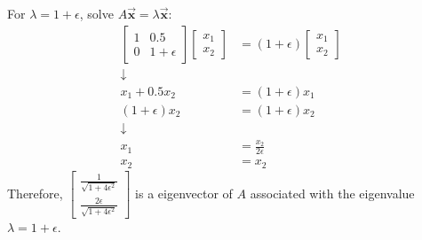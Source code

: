 \documentclass[letter, 11pt]{article}
\begin{document}
\begin{enumerate}[wide = 0pt, label = \textbf{Problem \arabic*:}]
\begin{enumerate}
			For $ \lambda = 1 + \epsilon $, solve $ A \vec{\bm{x}} = \lambda \vec{\bm{x}} $: 
			\begin{align*}
				\begin{bmatrix}
				1 & 0.5 \\
				0 & 1 + \epsilon
				\end{bmatrix}
				\begin{bmatrix}
				x_1 \\ x_2
				\end{bmatrix}
				&= 
				(1 + \epsilon)
				\begin{bmatrix}
				x_1 \\ x_2
				\end{bmatrix}
				\\ \downarrow \\
				x_1 + 0.5x_2 &= (1 + \epsilon) x_1 \\
				(1 + \epsilon) x_2 &= (1 + \epsilon) x_2 
				\\ \downarrow \\
				x_1 &= \frac{x_2}{2 \epsilon}\\
				x_2 &= x_2
			\end{align*}
			Therefore, $ \begin{bmatrix} \frac{1}{\sqrt{1 + 4 \epsilon^2}} \\ \frac{2 \epsilon}{\sqrt{1 + 4 \epsilon^2}} \end{bmatrix} $ is a eigenvector of $ A $ associated with the eigenvalue $ \lambda = 1 + \epsilon $. \\
			

\end{enumerate}
\end{enumerate}
\end{document}
